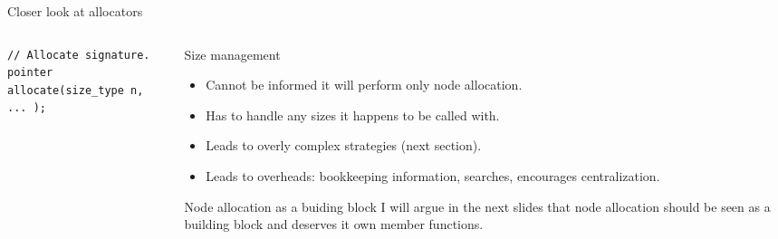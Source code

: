\documentclass[10pt,aspectratio=169]{beamer}
\begin{document}
\begin{frame}[fragile]
{Closer look at allocators}
\begin{columns}
\begin{column}{0.35\textwidth}

\begin{lstlisting}
// Allocate signature.
pointer allocate(size_type n, ... );
\end{lstlisting}

\end{column}

\begin{column}{0.55\textwidth}
\begin{block} {Size management}
\begin{itemize}
\item Cannot be informed it will perform only node allocation.
\item Has to handle any sizes it happens to be called with.
\item Leads to overly complex strategies (next section).
\item Leads to overheads: bookkeeping information, searches, 
encourages centralization.
\end{itemize}

\end{block}

\begin{block} {Node allocation as a buiding block}
I will argue in the next slides that node allocation should be seen as a
building block and deserves it own member functions.
\end{block}
\end{column}
\end{columns}
\end{frame}
\end{document}

